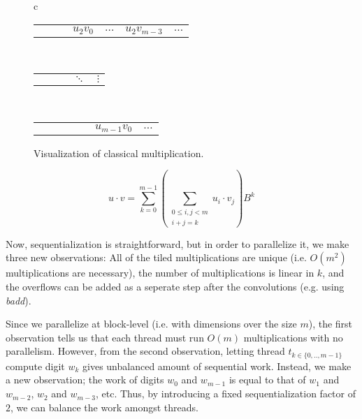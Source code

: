 {\begin{minipage}{0.5\textwidth}
\begin{figure}[H]
\begin{tabular}{c}
    \begin{tabular}{C{0cm}C{0.8cm}C{0.8cm}C{0.8cm}C{0.5cm}C{0.8cm}C{0cm}}
       & & & $u_2v_0$ & $\ldots$ & $u_2v_{m-3}$ & $\ldots$
    \end{tabular}\\[-0.6ex]
    \begin{tabular}{C{0.8cm}C{0.8cm}C{0.8cm}C{0.5cm}C{0.8cm}}
       & & & $\ddots$ & $\vdots$
    \end{tabular}\\[-0.6ex]
    \begin{tabular}{C{0cm}C{0.8cm}C{0.8cm}C{0.8cm}C{0.5cm}C{0.8cm}C{0cm}}
       & & & & & $u_{m-1}v_0$ & $\ldots$
    \end{tabular}
  \end{tabular}
  \caption{\footnotesize Visualization of classical multiplication.}
  \label{fig:tiledmult}
  \end{figure}
\end{minipage}
\begin{minipage}{0.49\textwidth}
    \centering
\begin{equation}
\label{eq:clasmul}
u \cdot v = \sum_{k=0}^{m-1} \left( \sum_{\substack{0\leq i,j < m\\i+j=k}}u_i\cdot v_j \right)B^{k}
\end{equation}
\end{minipage}
}

Now, sequentialization is straightforward, but in order to parallelize it, we
make three new observations: All of the tiled multiplications are unique
(i.e. $O(m^2)$ multiplications are necessary), the number of multiplications is
linear in $k$, and the overflows can be added as a seperate step after the
convolutions (e.g. using \textit{badd}).

Since we parallelize at block-level (i.e. with dimensions over the size $m$),
the first observation tells us that each thread must run $O(m)$ multiplications
with no parallelism. However, from the second observation, letting thread
$t_{k\in\{0,..,m-1\}}$ compute digit $w_k$ gives unbalanced amount of sequential
work. Instead, we make a new observation; the work of digits $w_0$ and $w_{m-1}$
is equal to that of $w_1$ and $w_{m-2}$, $w_2$ and $w_{m-3}$, etc. Thus, by
introducing a fixed sequentialization factor of $2$, we can balance the work
amongst threads.

